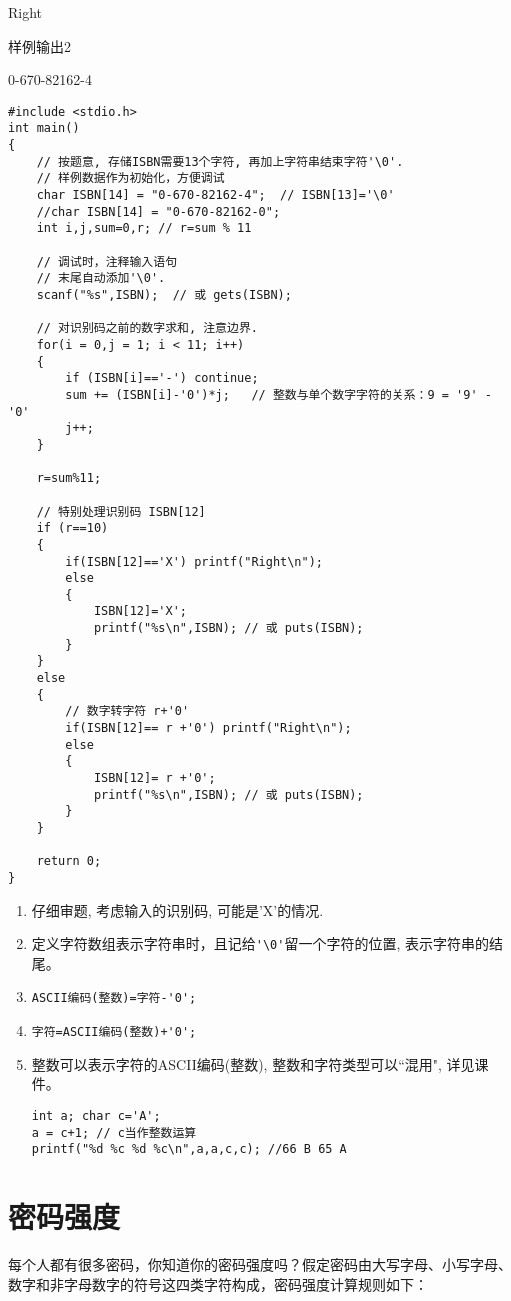 Right

样例输出2

0-670-82162-4

\begin{lstlisting}
#include <stdio.h>
int main()
{
	// 按题意, 存储ISBN需要13个字符, 再加上字符串结束字符'\0'.
	// 样例数据作为初始化，方便调试
	char ISBN[14] = "0-670-82162-4";  // ISBN[13]='\0'
	//char ISBN[14] = "0-670-82162-0";  
	int i,j,sum=0,r; // r=sum % 11 
	
	// 调试时，注释输入语句 
	// 末尾自动添加'\0'.
	scanf("%s",ISBN);  // 或 gets(ISBN);
	
	// 对识别码之前的数字求和, 注意边界.
	for(i = 0,j = 1; i < 11; i++)
	{
		if (ISBN[i]=='-') continue;
		sum += (ISBN[i]-'0')*j;   // 整数与单个数字字符的关系：9 = '9' -'0' 
		j++;
	}   
	
	r=sum%11;
	
	// 特别处理识别码 ISBN[12]
	if (r==10)
	{
		if(ISBN[12]=='X') printf("Right\n");
		else 
		{
			ISBN[12]='X';
			printf("%s\n",ISBN); // 或 puts(ISBN);
		}
	}
	else
	{
		// 数字转字符 r+'0'
		if(ISBN[12]== r +'0') printf("Right\n");
		else 
		{
			ISBN[12]= r +'0';
			printf("%s\n",ISBN); // 或 puts(ISBN);
		}
	} 

	return 0;
} 
\end{lstlisting}

\begin{note}[要点]
\begin{enumerate}
\item 仔细审题, 考虑输入的识别码, 可能是'X'的情况.
\item 定义字符数组表示字符串时，且记给\lstinline|'\0'|留一个字符的位置, 表示字符串的结尾。
\item \lstinline|ASCII编码(整数)=字符-'0';|
\item \lstinline|字符=ASCII编码(整数)+'0';|
\item 整数可以表示字符的ASCII编码(整数), 整数和字符类型可以``混用", 详见课件。
\begin{lstlisting}
int a; char c='A';
a = c+1; // c当作整数运算
printf("%d %c %d %c\n",a,a,c,c); //66 B 65 A 
\end{lstlisting}
\end{enumerate}
\end{note}

\section{密码强度}
每个人都有很多密码，你知道你的密码强度吗？假定密码由大写字母、小写字母、数字和非字母数字的符号这四类字符构成，密码强度计算规则如下：

